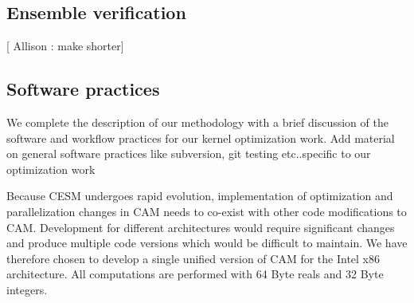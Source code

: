 \subsection{Ensemble verification}

[ {\color{red} Allison :} make shorter]




\subsection{Software practices}

We complete the description of our methodology with a brief discussion of the software and workflow practices for our kernel optimization work.
{\color{red} Add material on general software practices like subversion, git testing etc..specific to our optimization work}
 

Because CESM undergoes rapid evolution, implementation of optimization and parallelization changes in CAM needs to co-exist with other code modifications to CAM. Development for different architectures would require significant changes and produce multiple code versions which would be difficult to maintain. We have therefore chosen to develop a single unified version of CAM for the Intel x86 architecture.  All computations are performed with 64 Byte reals and 32 Byte integers.

